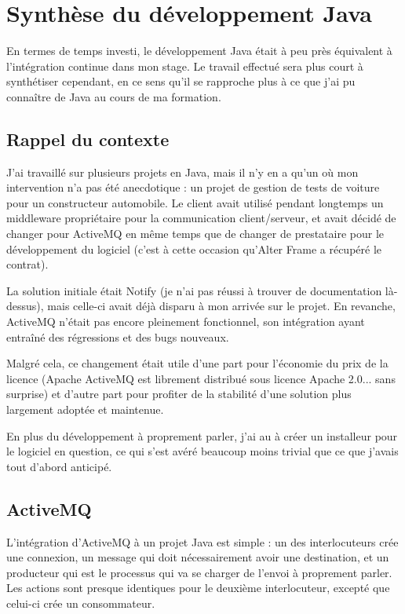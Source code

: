 \section{Synthèse du développement Java}
\label{sec:synthese_java}
En termes de temps investi, le développement Java était à peu près équivalent à l'intégration continue dans mon stage. Le travail effectué sera plus court à synthétiser cependant, en ce sens qu'il se rapproche plus à ce que j'ai pu connaître de Java au cours de ma formation.

\subsection{Rappel du contexte}
J'ai travaillé sur plusieurs projets en Java, mais il n'y en a qu'un où mon intervention n'a pas été anecdotique : un projet de gestion de tests de voiture pour un constructeur automobile. Le client avait utilisé pendant longtemps un middleware propriétaire pour la communication client/serveur, et avait décidé de changer pour ActiveMQ en même temps que de changer de prestataire pour le développement du logiciel (c'est à cette occasion qu'Alter Frame a récupéré le contrat).

La solution initiale était Notify (je n'ai pas réussi à trouver de documentation là-dessus), mais celle-ci avait déjà disparu à mon arrivée sur le projet. En revanche, ActiveMQ n'était pas encore pleinement fonctionnel, son intégration ayant entraîné des régressions et des bugs nouveaux.

Malgré cela, ce changement était utile d'une part pour l'économie du prix de la licence (Apache ActiveMQ est librement distribué sous licence Apache 2.0... sans surprise) et d'autre part pour profiter de la stabilité d'une solution plus largement adoptée et maintenue.

En plus du développement à proprement parler, j'ai au à créer un installeur pour le logiciel en question, ce qui s'est avéré beaucoup moins trivial que ce que j'avais tout d'abord anticipé.

\subsection{ActiveMQ}
L'intégration d'ActiveMQ à un projet Java est simple : un des interlocuteurs crée une connexion, un message qui doit nécessairement avoir une destination, et un producteur qui est le processus qui va se charger de l'envoi à proprement parler. Les actions sont presque identiques pour le deuxième interlocuteur, excepté que celui-ci crée un consommateur\cite{activemq_intro}.

